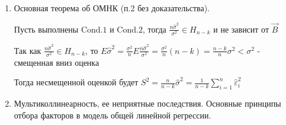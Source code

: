 \documentclass[12pt]{article}
\begin{document}
\begin{enumerate}
\begin{enumerate}
        \begin{MyProof}
            $\vec B - \vec \beta = A^{-1} Z \vec X - \vec \beta = A^{-1} Z (Z^T \vec \beta + \vec \varepsilon) - \vec \beta = A^{-1} Z \vec \varepsilon$
        \end{MyProof}

        \item $\vec B$ - несмещенная оценка для вектора $\vec \beta$

        \begin{MyProof}
            $E(\vec B - \vec \beta) = E(A^{-1} Z \vec \varepsilon) = A^{-1} Z E \vec \varepsilon = 0 \Longrightarrow E \vec B = \vec \beta$
        \end{MyProof}

        \item Матрица ковариаций $D \vec B = \sigma^2 A^{-1}$

        \begin{MyProof}
            $D \vec B = D (\vec B - \vec \beta) = D (A^{-1} Z \vec \varepsilon) = A^{-1} Z D \vec \varepsilon A^{-1}^T Z^T = A^{-1} Z \sigma^2 E_n A^{-1}^T Z^T = \sigma^2 A^{-1} (Z Z^T) A^{-1} = \sigma^2 A^{-1}$
        \end{MyProof}

        Следствие: дисперсии оценок $b_i$ можно выразить через $\sigma^2$ и коэффициенты матрицы $A^{-1}$: $D b_i = \sigma^2 (A^{-1})_{ii}$

    \end{enumerate}

    \item Основная теорема об ОМНК (п.2 без доказательства).

    \begin{MyTheorem}
        Пусть выполнены $\mathrm{Cond. 1}$ и $\mathrm{Cond. 2}$, тогда $\frac{n \hat \sigma^2}{\sigma^2} \in H_{n - k}$ и не зависит от $\vec B$
    \end{MyTheorem}
    
    Так как $\frac{n \hat \sigma^2}{\sigma^2} \in H_{n - k}$, то $E \hat \sigma^2 = \frac{\sigma^2}{n} E \frac{n \hat \sigma^2}{\sigma^2} = \frac{\sigma^2}{n} (n - k) = \frac{n - k}{n} \sigma^2 < \sigma^2$ - смещенная вниз оценка
    
    Тогда несмещенной оценкой будет $S^2 = \frac{n}{n - k} \hat \sigma^2 = \frac{1}{n - k} \sum_{i = 1}^n \hat \varepsilon_i^2$

    \item Мультиколлинеарность, ее неприятные последствия. Основные принципы отбора факторов в модель общей линейной регрессии.


\end{enumerate}
\end{document}
